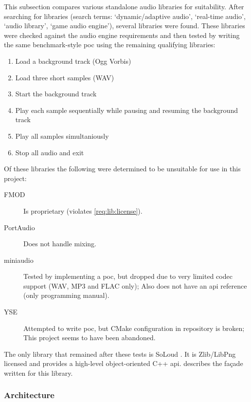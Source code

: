 \documentclass{projdoc}
\begin{document}
This subsection compares various standalone audio libraries for suitability. After
searching for libraries (search terms: `dynamic/adaptive audio', `real-time audio',
`audio library', `game audio engine'), several libraries were found. These libraries
were checked against the audio engine requirements \autocite{crepe:requirements} and
then tested by writing the same benchmark-style \gls{poc} using the remaining
qualifying libraries:\noparbreak
\begin{enumerate}
	\item Load a background track (Ogg Vorbis)
	\item Load three short samples (WAV)
	\item Start the background track
	\item Play each sample sequentially while pausing and resuming the background track
	\item Play all samples simultaniously
	\item Stop all audio and exit
\end{enumerate}

Of these libraries the following were determined to be unsuitable for use in this
project:\noparbreak
\begin{description}
	\item[FMOD \autocite{lib:fmod}] Is proprietary (violates \cref{req:lib:license}).
	\item[PortAudio \autocite{lib:portaudio}] Does not handle mixing.
	\item[miniaudio \autocite{lib:miniaudio}] Tested by implementing a \gls{poc}, but
		dropped due to very limited codec support (WAV, MP3 and FLAC only); Also does not
		have an \gls{api} reference (only programming manual).
	\item[YSE \autocite{lib:yse}] Attempted to write \gls{poc}, but CMake configuration
		in repository is broken; This project seems to have been abandoned.
\end{description}

The only library that remained after these tests is SoLoud \autocite{lib:soloud}. It
is Zlib/LibPng licensed and provides a high-level object-oriented C++ \gls{api}.
 describes the fa\c{c}ade written for this library.

\subsubsection{Architecture}
\label{sec:audio:architecture}
\end{document}
